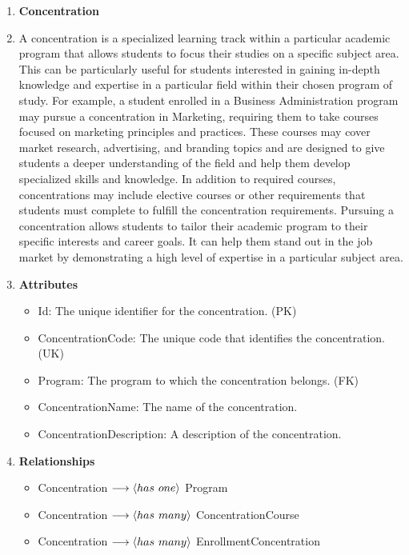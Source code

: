 \documentclass[12pt]{article}
\begin{document}
\begin{appendices}
\begin{enumerate}[label=(\roman*)]
    \newpage
    \item \textbf{Concentration}
    \item[] A concentration is a specialized learning track within a particular academic program that allows students to focus their studies on a specific subject area. This can be particularly useful for students interested in gaining in-depth knowledge and expertise in a particular field within their chosen program of study. For example, a student enrolled in a Business Administration program may pursue a concentration in Marketing, requiring them to take courses focused on marketing principles and practices. These courses may cover market research, advertising, and branding topics and are designed to give students a deeper understanding of the field and help them develop specialized skills and knowledge. In addition to required courses, concentrations may include elective courses or other requirements that students must complete to fulfill the concentration requirements. Pursuing a concentration allows students to tailor their academic program to their specific interests and career goals. It can help them stand out in the job market by demonstrating a high level of expertise in a particular subject area.
    \item[] \textbf{Attributes}
    \begin{itemize}
        \item Id: The unique identifier for the concentration. (PK)
        \item ConcentrationCode: The unique code that identifies the concentration. (UK)
        \item Program: The program to which the concentration belongs. (FK)
        \item ConcentrationName: The name of the concentration.
        \item ConcentrationDescription: A description of the concentration.
    \end{itemize}
    \item[] \textbf{Relationships}
    \begin{itemize}
        \item Concentration $ \longrightarrow \langle has \hspace{0.125cm} one \rangle $ Program
        \item Concentration $ \longrightarrow \langle has \hspace{0.125cm} many \rangle $ ConcentrationCourse
        \item Concentration $ \longrightarrow \langle has \hspace{0.125cm} many \rangle $ EnrollmentConcentration
    \end{itemize}


\end{enumerate}
\end{appendices}
\end{document}
